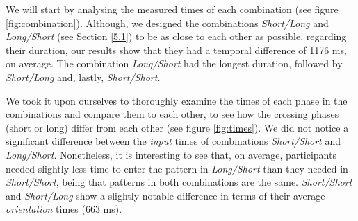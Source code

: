 We will start by analysing the measured times of each combination (see figure \ref{fig:combination}). Although, we designed the combinations \textit{Short/Long} and \textit{Long/Short} (see Section \ref{5.1}) to be as close to each other as possible, regarding their duration, our results show that they had a temporal difference of 1176 ms, on average. The combination \textit{Long/Short} had the longest duration, followed by \textit{Short/Long} and, lastly, \textit{Short/Short}.

We took it upon ourselves to thoroughly examine the times of each phase in the combinations and compare them to each other, to see how the crossing phases (short or long) differ from each other (see figure \ref{fig:times}). We did not notice a significant difference between the \textit{input} times of combinations \textit{Short/Short} and \textit{Long/Short}. Nonetheless, it is interesting to see that, on average, participants needed slightly less time to enter the pattern in \textit{Long/Short} than they needed in \textit{Short/Short}, being that patterns in both combinations are the same. \textit{Short/Short} and \textit{Short/Long} show a slightly notable difference in terms of their average \textit{orientation} times (663 ms). 

